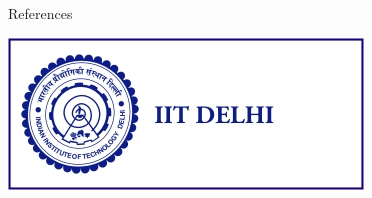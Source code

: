 \documentclass[final]{beamer}
\newlength{\sepwid}
\newlength{\onecolwid}
\begin{document}
\begin{frame}
\begin{columns}[t]
\begin{column}{\onecolwid}

\begin{exampleblock}{References}

\nocite{*} %
\small{
\vspace{1cm}}
\end{exampleblock}


\begin{center}
\includegraphics[width=0.7\linewidth]{img/iitd_logo.jpg}
\end{center}





\end{column} %

\begin{column}{\sepwid}\end{column} %

\end{columns} %

\end{frame} %
\end{document}
